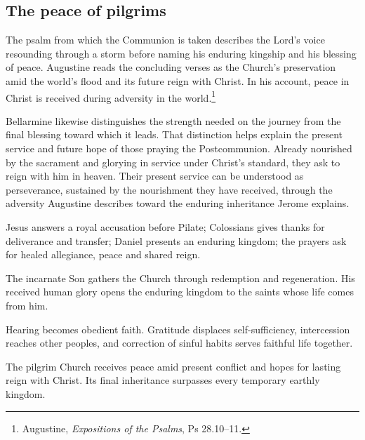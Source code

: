 \subsection{The peace of pilgrims}
The psalm from which the Communion is taken describes the Lord's voice resounding through a storm before naming his enduring kingship and his blessing of peace. Augustine reads the concluding verses as the Church's preservation amid the world's flood and its future reign with Christ. In his account, peace in Christ is received during adversity in the world.\footnote{Augustine, \emph{Expositions of the Psalms}, Ps 28.10--11.}

Bellarmine likewise distinguishes the strength needed on the journey from the final blessing toward which it leads. That distinction helps explain the present service and future hope of those praying the Postcommunion. Already nourished by the sacrament and glorying in service under Christ's standard, they ask to reign with him in heaven. Their present service can be understood as perseverance, sustained by the nourishment they have received, through the adversity Augustine describes toward the enduring inheritance Jerome explains.

\begin{fourSenses}
\item[Literal.] Jesus answers a royal accusation before Pilate; Colossians gives thanks for deliverance and transfer; Daniel presents an enduring kingdom; the prayers ask for healed allegiance, peace and shared reign.
\item[Allegorical.] The incarnate Son gathers the Church through redemption and regeneration. His received human glory opens the enduring kingdom to the saints whose life comes from him.
\item[Moral.] Hearing becomes obedient faith. Gratitude displaces self-sufficiency, intercession reaches other peoples, and correction of sinful habits serves faithful life together.
\item[Anagogical.] The pilgrim Church receives peace amid present conflict and hopes for lasting reign with Christ. Its final inheritance surpasses every temporary earthly kingdom.
\end{fourSenses}
